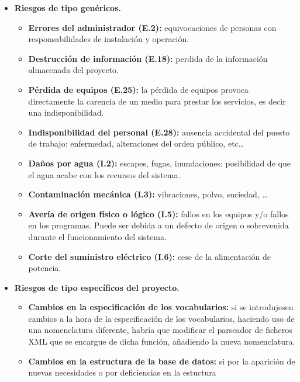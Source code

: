 \begin{itemize}
    \item \textbf{Riesgos de tipo genéricos.}
    \begin{itemize}
        \item \textbf{Errores del administrador (E.2):} equivocaciones de personas
               con responsabilidades de instalación y operación.
        \item \textbf{Destrucción de información (E.18):} perdida de la
               información almacenada del proyecto.
        \item \textbf{Pérdida de equipos (E.25):} la pérdida de equipos provoca
               directamente la carencia de un medio para prestar los servicios,
               es decir una indisponibilidad. 
        \item \textbf{Indisponibilidad del personal (E.28):} ausencia accidental
               del puesto de trabajo: enfermedad, alteraciones del orden público,
               etc\ldots
        \item \textbf{Daños por agua (I.2):} escapes, fugas, inundaciones:
               posibilidad de que el agua acabe con los recursos del sistema.
        \item \textbf{Contaminación mecánica (I.3):} vibraciones, polvo, suciedad,
               \ldots
        \item \textbf{Avería de origen físico o lógico (I.5):} fallos en los
               equipos y/o fallos en los programas. Puede ser debida a un defecto de
               origen o sobrevenida durante el funcionamiento del sistema.
        \item \textbf{Corte del suministro eléctrico (I.6):} cese de la
               alimentación de potencia.
    \end{itemize}
    \item \textbf{Riesgos de tipo específicos del proyecto.}
    \begin{itemize}
        \item \textbf{Cambios en la especificación de los vocabularios:} si se
            introdujesen cambios a la hora de la especificación de los
            vocabularios, haciendo uso de una nomenclatura diferente, habría que
            modificar el parseador de ficheros XML que se encargue de dicha
            función, añadiendo la nueva nomenclatura.
        \item \textbf{Cambios en la estructura de la base de datos:} si por la
            aparición de nuevas necesidades o por deficiencias en la estuctura

\end{itemize}
\end{itemize}
